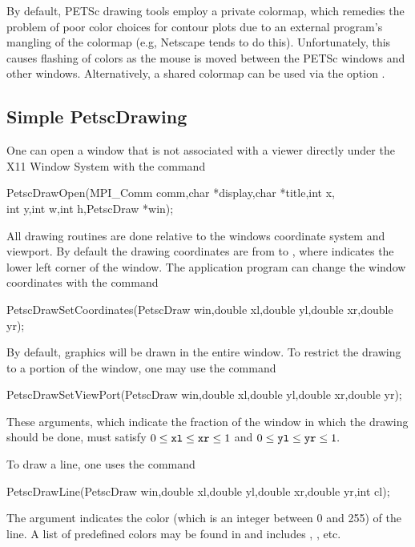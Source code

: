 {{{\medskip
By default, PETSc drawing tools employ a private colormap,
which remedies the problem of poor color choices for contour plots due
to an external program's mangling of the colormap (e.g, Netscape tends
to do this).
Unfortunately, this causes flashing of colors as the mouse is moved
between the PETSc windows and other windows.  Alternatively, a shared
colormap can be used via the option .

\subsection{Simple PetscDrawing}

One can open a window that is not associated with a viewer directly 
under the X11 Window System with the
command  
\begin{tabbing}
  PetscDrawOpen(MPI\_Comm comm,char *display,char *title,int x,\\
                 int y,int w,int h,PetscDraw *win);
\end{tabbing}
All drawing routines are done relative to the windows coordinate system 
and viewport. By default the drawing coordinates are from  to 
, where  indicates the lower left corner of the 
window. The application program can change the window coordinates with the 
command  
\begin{tabbing}
  PetscDrawSetCoordinates(PetscDraw win,double xl,double yl,double xr,double yr);
\end{tabbing}
By default, graphics will be drawn in the entire window. To restrict the 
drawing to a portion of the window, one may 
use the command 
\begin{tabbing}
  PetscDrawSetViewPort(PetscDraw win,double xl,double yl,double xr,double yr);
\end{tabbing}
These arguments, which indicate the fraction of the window in which the 
drawing should be done, must satisfy 
$ 0 \leq {\tt xl} \leq {\tt xr} \leq 1 $ and $ 0 \leq {\tt yl} \leq {\tt yr} \leq 1.$ 

To draw a line, one uses
 the command  
\begin{tabbing}
  PetscDrawLine(PetscDraw win,double xl,double yl,double xr,double yr,int cl);
\end{tabbing}
The argument  indicates the color (which is an integer between 0 and 255)
of the line. A list of predefined colors may be found in 
and includes , ,  etc.

}}}
